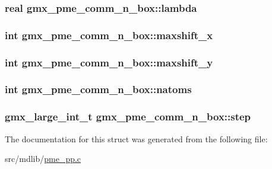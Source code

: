 \hypertarget{structgmx__pme__comm__n__box_ae2cf20476322a735a09b9e87df1eaa27}{
\subsubsection[{lambda}]{\setlength{\rightskip}{0pt plus 5cm}real {\bf gmx\-\_\-pme\-\_\-comm\-\_\-n\-\_\-box\-::lambda}}}\label{structgmx__pme__comm__n__box_ae2cf20476322a735a09b9e87df1eaa27}
\hypertarget{structgmx__pme__comm__n__box_a6fa23ffd2d899504a68a5f5b66d7c4f9}{
\subsubsection[{maxshift\-\_\-x}]{\setlength{\rightskip}{0pt plus 5cm}int {\bf gmx\-\_\-pme\-\_\-comm\-\_\-n\-\_\-box\-::maxshift\-\_\-x}}}\label{structgmx__pme__comm__n__box_a6fa23ffd2d899504a68a5f5b66d7c4f9}
\hypertarget{structgmx__pme__comm__n__box_a3a5b3a1f258084e7bc60b53a4f01c6e1}{
\subsubsection[{maxshift\-\_\-y}]{\setlength{\rightskip}{0pt plus 5cm}int {\bf gmx\-\_\-pme\-\_\-comm\-\_\-n\-\_\-box\-::maxshift\-\_\-y}}}\label{structgmx__pme__comm__n__box_a3a5b3a1f258084e7bc60b53a4f01c6e1}
\hypertarget{structgmx__pme__comm__n__box_aa539f8089c065474cfe199f806a60246}{
\subsubsection[{natoms}]{\setlength{\rightskip}{0pt plus 5cm}int {\bf gmx\-\_\-pme\-\_\-comm\-\_\-n\-\_\-box\-::natoms}}}\label{structgmx__pme__comm__n__box_aa539f8089c065474cfe199f806a60246}
\hypertarget{structgmx__pme__comm__n__box_ae169f7360bdc6f86e3c5d06675abad63}{
\subsubsection[{step}]{\setlength{\rightskip}{0pt plus 5cm}gmx\-\_\-large\-\_\-int\-\_\-t {\bf gmx\-\_\-pme\-\_\-comm\-\_\-n\-\_\-box\-::step}}}\label{structgmx__pme__comm__n__box_ae169f7360bdc6f86e3c5d06675abad63}


\-The documentation for this struct was generated from the following file\-:\begin{DoxyCompactItemize}
\item 
src/mdlib/\hyperlink{pme__pp_8c}{pme\-\_\-pp.\-c}\end{DoxyCompactItemize}
